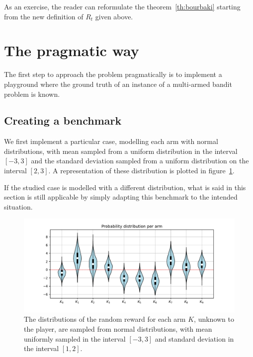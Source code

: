 \documentclass[]{scrartcl}
\theoremstyle{definition}
\begin{document}
\noindent
As an exercise, the reader can reformulate the theorem~\ref{th:bourbaki} starting from the new definition of $R_t$ given above.


\section{The pragmatic way}
\label{se:pragmatic_perspective}

The first step to approach the problem pragmatically is to implement a playground where the ground truth of an instance of a multi-armed bandit problem is known. 

\subsection*{Creating a benchmark}

We first implement a particular case, modelling each arm with normal distributions, with mean sampled from a uniform distribution in the interval $[-3, 3]$ and the standard deviation sampled from a uniform distribution on the interval $[2, 3]$. A representation of these distribution is plotted in
figure~\ref{fig:volin_plot}.

If the studied case is modelled with a different distribution, what is said in this section is still applicable by simply adapting this benchmark to the intended situation.

\begin{figure}[h]
    \hspace{-1.5cm}
    \includegraphics[width=18cm]{figures/initial_distributions.pdf}
    \caption{The distributions of the random reward for each arm $K$, unknown to the player, are sampled from normal distributions, with mean uniformly sampled in the interval $[-3, 3]$ and standard deviation in the interval $[1, 2]$.}
    \label{fig:volin_plot}
\end{figure}
\end{document}
